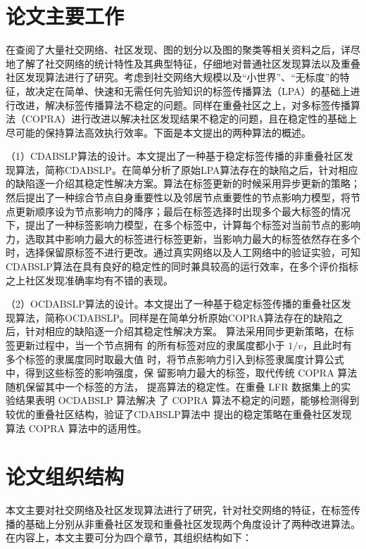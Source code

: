 \section{论文主要工作}

在查阅了大量社交网络、社区发现、图的划分以及图的聚类等相关资料之后，详尽地了解了社交网络的统计特性及其典型特征，仔细地对普通社区发现算法以及重叠社区发现算法进行了研究。考虑到社交网络大规模以及“小世界”、“无标度”的特征，故决定在简单、快速和无需任何先验知识的标签传播算法（LPA）的基础上进行改进，解决标签传播算法不稳定的问题。同样在重叠社区之上，对多标签传播算法（COPRA）进行改进以解决社区发现结果不稳定的问题，且在稳定性的基础上尽可能的保持算法高效执行效率。下面是本文提出的两种算法的概述。

（1）CDABSLP算法的设计。本文提出了一种基于稳定标签传播的非重叠社区发现算法，简称CDABSLP。在简单分析了原始LPA算法存在的缺陷之后，针对相应的缺陷逐一介绍其稳定性解决方案。算法在标签更新的时候采用异步更新的策略；然后提出了一种综合节点自身重要性以及邻居节点重要性的节点影响力模型，将节点更新顺序设为节点影响力的降序；最后在标签选择时出现多个最大标签的情况下，提出了一种标签影响力模型，在多个标签中，计算每个标签对当前节点的影响力，选取其中影响力最大的标签进行标签更新，当影响力最大的标签依然存在多个时，选择保留原标签不进行更改。通过真实网络以及人工网络中的验证实验，可知CDABSLP算法在具有良好的稳定性的同时兼具较高的运行效率，在多个评价指标之上社区发现准确率均有不错的表现。


（2）OCDABSLP算法的设计。本文提出了一种基于稳定标签传播的重叠社区发现算法，简称OCDABSLP。同样是在简单分析原始COPRA算法存在的缺陷之后，针对相应的缺陷逐一介绍其稳定性解决方案。
算法采用同步更新策略，在标签更新过程中，当一个节点拥有
的所有标签对应的隶属度都小于 $1/v$，且此时有多个标签的隶属度同时取最大值
时，将节点影响力引入到标签隶属度计算公式中，得到这些标签的影响强度，保
留影响力最大的标签，取代传统 COPRA 算法随机保留其中一个标签的方法，
提高算法的稳定性。在重叠 LFR 数据集上的实验结果表明 OCDABSLP 算法解决
了 COPRA 算法不稳定的问题，能够检测得到较优的重叠社区结构，验证了CDABSLP算法中
提出的稳定策略在重叠社区发现算法 COPRA 算法中的适用性。


\section{论文组织结构}

本文主要对社交网络及社区发现算法进行了研究，针对社交网络的特征，在标签传播的基础上分别从非重叠社区发现和重叠社区发现两个角度设计了两种改进算法。在内容上，本文主要可分为四个章节，其组织结构如下：

